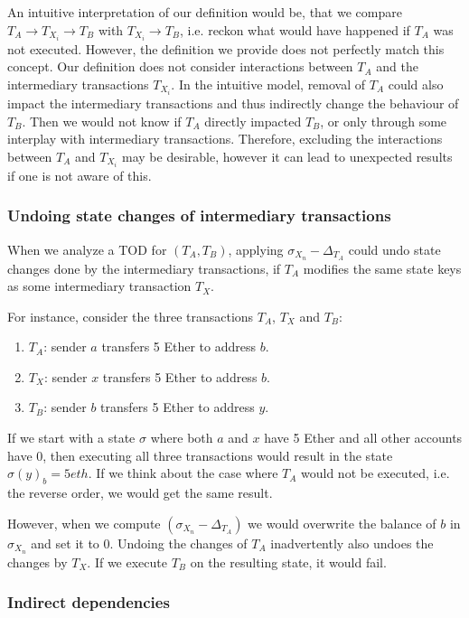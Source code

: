 \documentclass[draft,final]{vutinfth} %
\begin{document}
An intuitive interpretation of our definition would be, that we compare $T_A \rightarrow T_{X_i} \rightarrow T_B$ with $T_{X_i} \rightarrow T_B$, i.e. reckon what would have happened if $T_A$ was not executed. However, the definition we provide does not perfectly match this concept. Our definition does not consider interactions between $T_A$ and the intermediary transactions $T_{X_i}$. In the intuitive model, removal of $T_A$ could also impact the intermediary transactions and thus indirectly change the behaviour of $T_B$. Then we would not know if $T_A$ directly impacted $T_B$, or only through some interplay with intermediary transactions. Therefore, excluding the interactions between $T_A$ and $T_{X_i}$ may be desirable, however it can lead to unexpected results if one is not aware of this.

\subsubsection{Undoing state changes of intermediary transactions}

When we analyze a TOD for $(T_A, T_B)$, applying $\sigma_{X_n} - \Delta_{T_A}$ could undo state changes done by the intermediary transactions, if $T_A$ modifies the same state keys as some intermediary transaction $T_X$.

For instance, consider the three transactions $T_A$, $T_X$ and $T_B$:

\begin{enumerate}
    \item $T_A$: sender $a$ transfers 5 Ether to address $b$.
    \item $T_X$: sender $x$ transfers 5 Ether to address $b$.
    \item $T_B$: sender $b$ transfers 5 Ether to address $y$.
\end{enumerate}

If we start with a state $\sigma$ where both $a$ and $x$ have 5 Ether and all other accounts have 0, then executing all three transactions would result in the state $\sigma(y)_b = 5 eth$. If we think about the case where $T_A$ would not be executed, i.e. the reverse order, we would get the same result.

However, when we compute $(\sigma_{X_n} - \Delta_{T_A})$ we would overwrite the balance of $b$ in $\sigma_{X_n}$ and set it to 0. Undoing the changes of $T_A$ inadvertently also undoes the changes by $T_X$. If we execute $T_B$ on the resulting state, it would fail.

\subsubsection{Indirect dependencies}
\end{document}
